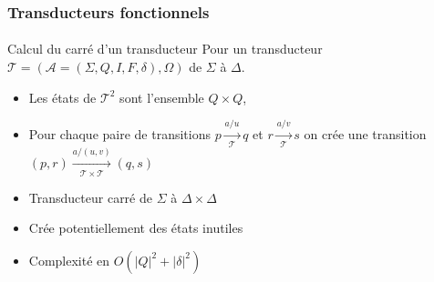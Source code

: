 \frametitle{Transducteurs fonctionnels}
\framesubtitle{}

\begin{exampleblock}{Calcul du carré d'un transducteur}
	Pour un transducteur $\mathscr{T} = (\mathscr{A} = (\Sigma, Q, I, F, \delta), \Omega)$ de $\Sigma$ à $\Delta$.
	
	\begin{itemize}
		\item Les états de $\mathscr{T}^2$ sont l'ensemble $Q \times Q$,
		\item Pour chaque paire de transitions $p \xrightarrow[\mathscr{T}]{a/u} q$ et $r \xrightarrow[\mathscr{T}]{a/v} s$ on crée une transition $(p,r) \xrightarrow[\mathscr{T} \times \mathscr{T}]{a/(u, v)} (q,s)$
		\item Transducteur carré de $\Sigma$ à $\Delta \times \Delta$
		\item Crée potentiellement des états inutiles
		\item Complexité en $O(|Q|^2 + |\delta|^2)$
	\end{itemize}
\end{exampleblock}

